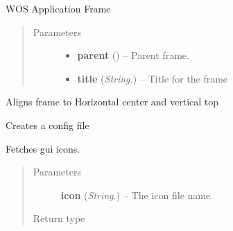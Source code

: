 \documentclass[letterpaper,10pt,english]{sphinxmanual}
\begin{document}
\begin{fulllineitems}
\label{api:wos.GUI}
WOS Application Frame
\begin{quote}\begin{description}
\item[{Parameters}] \leavevmode\begin{itemize}
\item {} 
\textbf{parent} () -- Parent frame.

\item {} 
\textbf{title} (\emph{String.}) -- Title for the frame

\end{itemize}

\end{description}\end{quote}

\begin{fulllineitems}
\label{api:wos.GUI.AlignCenterTop}
Aligns frame to Horizontal center and vertical top

\end{fulllineitems}


\begin{fulllineitems}
\label{api:wos.GUI.CreateConfig}
Creates a config file

\end{fulllineitems}


\begin{fulllineitems}
\label{api:wos.GUI.GetIcon}
Fetches gui icons.
\begin{quote}\begin{description}
\item[{Parameters}] \leavevmode
\textbf{icon} (\emph{String.}) -- The icon file name.

\item[{Return type}] \leavevmode
{}

\end{description}\end{quote}

\end{fulllineitems}


\end{fulllineitems}
\end{document}
